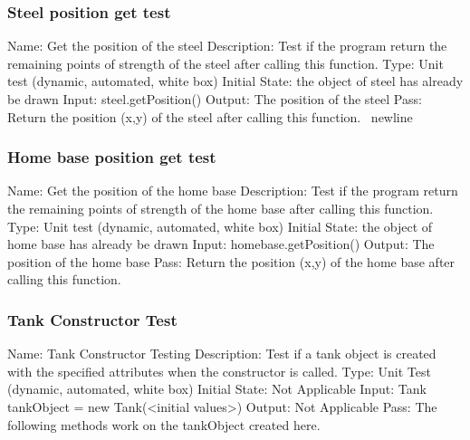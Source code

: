 \documentclass{article}
\begin{document}
\subsubsection{Steel position get test}
Name:  Get the position of the steel\newline
Description: Test if the program return the remaining points of strength of 
the steel after calling this function. \newline
Type: Unit test (dynamic, automated, white box) \newline
Initial State:  the object of steel has already be drawn\newline
Input: steel.getPosition()\newline
Output: The position of the steel\newline
Pass:  Return the position (x,y) of the steel after calling this function. 

\subsubsection{Home base position get test}
Name:  Get the position of the home base\newline
Description: Test if the program return the remaining points of strength of 
the home base after calling this function. \newline
Type: Unit test (dynamic, automated, white box) \newline
Initial State:  the object of home base has already be drawn\newline
Input: homebase.getPosition()\newline
Output: The position of the home base\newline
Pass:  Return the position (x,y) of the home base after calling this function. 
\newline

\subsubsection{Tank Constructor Test}
Name: Tank Constructor Testing\newline
Description: Test if a tank object is created with the specified attributes 
when the constructor is called.\newline
Type: Unit Test (dynamic, automated, white box)\newline
Initial State: Not Applicable\newline
Input: Tank tankObject = new Tank(<initial values>)\newline
Output: Not Applicable \newline
Pass: The following methods work on the tankObject created here.\newline
\end{document}
